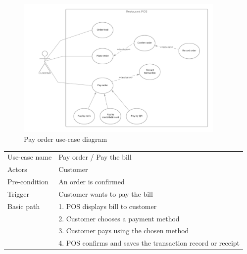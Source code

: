 \begin{figure}[H]
  \centering
  \includegraphics[width=0.9\textwidth]{./assets/t1/PayOrder.png}
  \caption{Pay order use-case diagram}
\end{figure}

\begin{center}
  \begin{tabular}{*{2}{l}}
    \toprule
    Use-case name & Pay order / Pay the bill                                    \\
    Actors        & Customer                                                    \\
    Pre-condition & An order is confirmed                                       \\
    Trigger       & Customer wants to pay the bill                              \\
    Basic path    & 1. POS displays bill to customer                            \\
                  & 2. Customer chooses a payment method                        \\
                  & 3. Customer pays using the chosen method                    \\
                  & 4. POS confirms and saves the transaction record or receipt \\
    \bottomrule
  \end{tabular}
\end{center}
